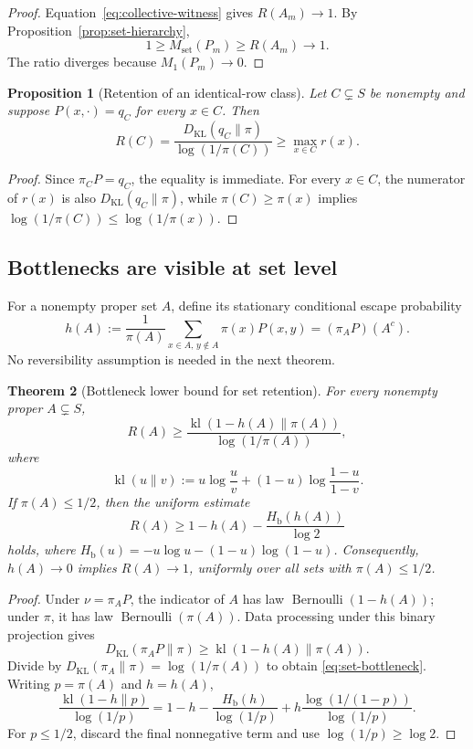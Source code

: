 \documentclass[11pt]{article}
\newtheorem{theorem}{Theorem}[section]
\newtheorem{proposition}[theorem]{Proposition}
\newcommand{\KL}{D_{\mathrm{KL}}}
\newcommand{\Mone}{M_1}
\newcommand{\Mset}{M_{\mathrm{set}}}
\newcommand{\kl}{\operatorname{kl}}
\begin{document}
\begin{proof}
Equation~\eqref{eq:collective-witness} gives \(R(A_m)\to1\).  By
Proposition~\ref{prop:set-hierarchy},
\[
  1\ge\Mset(P_m)\ge R(A_m)\longrightarrow1.
\]
The ratio diverges because \(\Mone(P_m)\to0\).
\end{proof}

\begin{proposition}[Retention of an identical-row class]
\label{prop:row-class}
Let \(C\subsetneq S\) be nonempty and suppose
\(P(x,\cdot)=q_C\) for every \(x\in C\).  Then
\[
  R(C)
  =
  \frac{\KL(q_C\|\pi)}{\log(1/\pi(C))}
  \ge\max_{x\in C}r(x).
\]
\end{proposition}

\begin{proof}
Since \(\pi_CP=q_C\), the equality is immediate.  For every \(x\in C\),
the numerator of \(r(x)\) is also \(\KL(q_C\|\pi)\), while
\(\pi(C)\ge\pi(x)\) implies
\(\log(1/\pi(C))\le\log(1/\pi(x))\).
\end{proof}

\subsection{Bottlenecks are visible at set level}

For a nonempty proper set \(A\), define its stationary conditional escape
probability
\[
  h(A)
  :=
  \frac{1}{\pi(A)}
  \sum_{x\in A,\,y\notin A}\pi(x)P(x,y)
  =(\pi_AP)(A^c).
\]
No reversibility assumption is needed in the next theorem.

\begin{theorem}[Bottleneck lower bound for set retention]
\label{thm:set-bottleneck}
For every nonempty proper \(A\subsetneq S\),
\begin{equation}
  R(A)
  \ge
  \frac{\kl(1-h(A)\|\pi(A))}
       {\log(1/\pi(A))},
  \label{eq:set-bottleneck}
\end{equation}
where
\[
  \kl(u\|v)
  :=u\log\frac uv+(1-u)\log\frac{1-u}{1-v}.
\]
If \(\pi(A)\le1/2\), then the uniform estimate
\begin{equation}
  R(A)
  \ge
  1-h(A)-\frac{H_{\mathrm b}(h(A))}{\log2}
  \label{eq:set-bottleneck-uniform}
\end{equation}
holds, where
\(H_{\mathrm b}(u)=-u\log u-(1-u)\log(1-u)\).
Consequently, \(h(A)\to0\) implies \(R(A)\to1\), uniformly over all
sets with \(\pi(A)\le1/2\).
\end{theorem}

\begin{proof}
Under \(\nu=\pi_AP\), the indicator of \(A\) has law
\(\operatorname{Bernoulli}(1-h(A))\); under \(\pi\), it has law
\(\operatorname{Bernoulli}(\pi(A))\).  Data processing under this binary
projection gives
\[
  \KL(\pi_AP\|\pi)
  \ge\kl(1-h(A)\|\pi(A)).
\]
Divide by \(\KL(\pi_A\|\pi)=\log(1/\pi(A))\) to obtain
\eqref{eq:set-bottleneck}.  Writing \(p=\pi(A)\) and \(h=h(A)\),
\[
  \frac{\kl(1-h\|p)}{\log(1/p)}
  =
  1-h-\frac{H_{\mathrm b}(h)}{\log(1/p)}
  +h\frac{\log(1/(1-p))}{\log(1/p)}.
\]
For \(p\le1/2\), discard the final nonnegative term and use
\(\log(1/p)\ge\log2\).
\end{proof}
\end{document}
